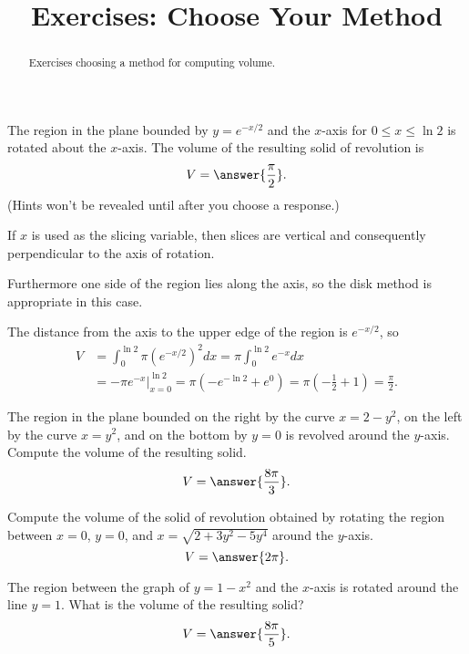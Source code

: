 \documentclass{ximera}
\title{Exercises: Choose Your Method}
\begin{document}
\begin{abstract}
Exercises choosing a method for computing volume.
\end{abstract}
\maketitle

\begin{exercise}%
The region in the plane bounded by $y = e^{-x/2}$ and the $x$-axis for $0 \leq x \leq \ln 2$ is rotated about the $x$-axis. The volume of the resulting solid of revolution is
\[ V = \answer{ \frac{\pi}{2}}. \]
(Hints won't be revealed until after you choose a response.)
\begin{feedback}
If $x$ is used as the slicing variable, then slices are vertical and consequently perpendicular to the axis of rotation. \begin{hint}
Furthermore one side of the region lies along the axis, so the disk method is appropriate in this case. 
\begin{hint}
The distance from the axis to the upper edge of the region is $e^{-x/2}$, so
\[ \begin{aligned} V & = \int_0^{\ln 2} \pi \left( e^{-x/2} \right)^2 dx = \pi \int_0^{\ln 2} e^{-x} dx \\ & =  \left. - \pi e^{-x} \right|_{x=0}^{\ln 2} = \pi (-e^{-\ln 2} + e^0) = \pi \left( - \frac{1}{2} + 1 \right) = \frac{\pi}{2}. \end{aligned}\]
\end{hint}
\end{hint}
\end{feedback}
\end{exercise}

\begin{exercise}
 The region in the plane bounded on the right by the curve $x = 2 - y^2$, on the left by the curve $x = y^2$, and on the bottom by $y = 0$ is revolved around the $y$-axis. Compute the volume of the resulting solid.
 \[ V = \answer{\frac{8 \pi}{3}}. \]
 \end{exercise}
 
 
 \begin{exercise}%
Compute the volume of the solid of revolution obtained by rotating the region between $x=0$, $y=0$, and $x=\sqrt{2+3y^2 - 5y^4}$ around the $y$-axis.
\[ V = \answer{2 \pi}. \]
\end{exercise}


\begin{exercise}%

The region between the graph of \(y = 1-x^2\) and the \(x\)-axis is rotated around the line \(y=1\). What is the volume of the resulting solid?
\[ V= \answer{ \frac{8 \pi}{5}}. \]
\end{exercise}
\end{document}
